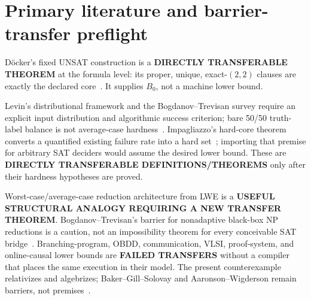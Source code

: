 \documentclass[11pt]{article}
\begin{document}
\section{Primary literature and barrier-transfer preflight}
D\"ocker's fixed UNSAT construction is a \textbf{DIRECTLY TRANSFERABLE
THEOREM} at the formula level: its proper, unique, exact-\((2,2)\) clauses are
exactly the declared core~\cite{Doecker21}.  It supplies \(B_0\), not a
machine lower bound.

Levin's distributional framework and the Bogdanov--Trevisan survey require an
explicit input distribution and algorithmic success criterion; bare 50/50
truth-label balance is not average-case hardness~\cite{Levin86,BT06}.
Impagliazzo's hard-core theorem converts a quantified existing failure rate
into a hard set~\cite{Impagliazzo95}; importing that premise for arbitrary SAT
deciders would assume the desired lower bound.  These are \textbf{DIRECTLY
TRANSFERABLE DEFINITIONS/THEOREMS} only after their hardness hypotheses are
proved.

Worst-case/average-case reduction architecture from LWE is a \textbf{USEFUL
STRUCTURAL ANALOGY REQUIRING A NEW TRANSFER THEOREM}.  Bogdanov--Trevisan's
barrier for nonadaptive black-box NP reductions is a caution, not an
impossibility theorem for every conceivable SAT bridge~\cite{BT06b}.
Branching-program, OBDD, communication, VLSI, proof-system, and online-causal
lower bounds are \textbf{FAILED TRANSFERS} without a compiler that places the
same execution in their model.  The present counterexample relativizes and
algebrizes; Baker--Gill--Solovay and Aaronson--Wigderson remain barriers, not
premises~\cite{BGS75,AW09}.
\end{document}
